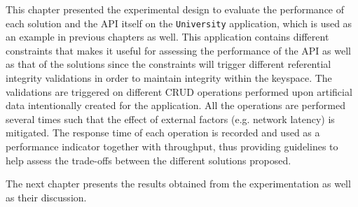 This chapter  presented the experimental design to evaluate the performance of
each  solution and the  \ac{API} itself on the \texttt{University} application,
which is  used as an example in previous chapters as well. This application
contains different constraints that makes it useful for assessing the
performance of the \ac{API} as well as that of the solutions since the
 constraints  will trigger different referential integrity validations in order
 to maintain integrity within the keyspace.  The validations are triggered on
 different \ac{CRUD} operations performed upon artificial data intentionally
 created for the application. All the operations are  performed 
  several times such that the effect of external factors (e.g.  network latency)
 is mitigated.  The response time of each operation is recorded and 
 used as a performance indicator together with throughput,  thus providing 
 guidelines to help assess the trade-offs between the different solutions
proposed. 
	
	
The next chapter presents the results obtained from the experimentation as well 
as their discussion. 
 






